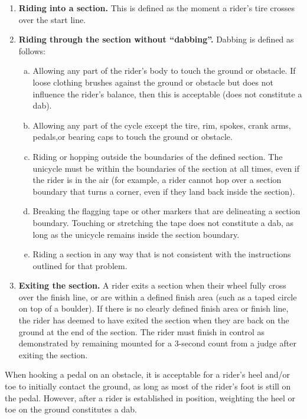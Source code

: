\begin{enumerate}
\item \textbf{Riding into a section.} This is defined as the moment a rider's tire crosses over the start line.
\item \textbf{Riding through the section without ``dabbing''.} Dabbing is defined as follows:
	\begin{enumerate}[a.]
	\item Allowing any part of the rider's body to touch the ground or obstacle.
	If loose clothing brushes against the ground or obstacle but does not influence the rider's balance, then this is acceptable (does not constitute a dab).
	\item Allowing any part of the cycle except the tire, rim, spokes, crank arms, pedals,or bearing caps to touch the ground or obstacle.
	\item Riding or hopping outside the boundaries of the defined section.
	The unicycle must be within the boundaries of the section at all times, even if the rider is in the air (for example, a rider cannot hop over a section boundary that turns a corner, even if they land back inside the section).
	\item Breaking the flagging tape or other markers that are delineating a section boundary.
	Touching or stretching the tape does not constitute a dab, as long as the unicycle remains inside the section boundary.
	\item Riding a section in any way that is not consistent with the instructions outlined for that problem.
	\end{enumerate}
\item \textbf{Exiting the section.} A rider exits a section when their wheel fully cross over the finish line, or are within a defined finish area (such as a taped circle on top of a boulder).
If there is no clearly defined finish area or finish line, the rider has deemed to have exited the section when they are back on the ground at the end of the section.
The rider must finish in control as demonstrated by remaining mounted for a 3-second count from a judge after exiting the section.
\end{enumerate}

When hooking a pedal on an obstacle, it is acceptable for a rider's heel and/or toe to initially contact the ground, as long as most of the rider's foot is still on the pedal.
However, after a rider is established in position, weighting the heel or toe on the ground constitutes a dab.

